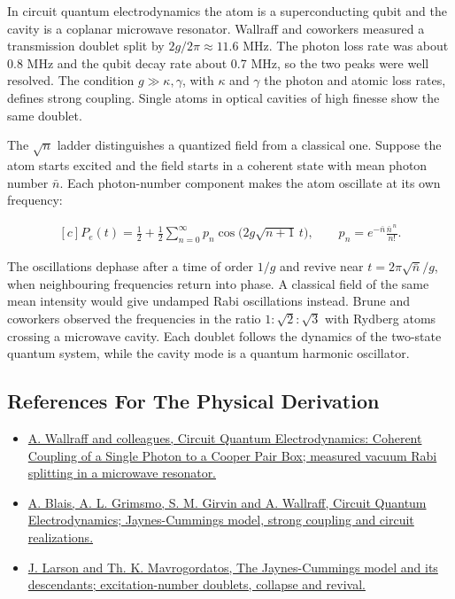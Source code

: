 \documentclass[11pt,oneside]{book}
\newenvironment{centeredalign}{\[\begin{gathered}[c]}{\end{gathered}\]}
\begin{document}
In circuit quantum electrodynamics the atom is a superconducting qubit and the cavity is a coplanar microwave resonator. Wallraff and coworkers measured a transmission doublet split by \(2g/2\pi\approx11.6\) MHz. The photon loss rate was about 0.8 MHz and the qubit decay rate about 0.7 MHz, so the two peaks were well resolved. The condition \(g\gg\kappa,\gamma\), with \(\kappa\) and \(\gamma\) the photon and atomic loss rates, defines strong coupling. Single atoms in optical cavities of high finesse show the same doublet.

The \(\sqrt n\) ladder distinguishes a quantized field from a classical one. Suppose the atom starts excited and the field starts in a coherent state with mean photon number \(\bar n\). Each photon-number component makes the atom oscillate at its own frequency:

\begin{centeredalign}
P_e(t)=\frac12+\frac12\sum_{n=0}^\infty p_n\cos\big(2g\sqrt{n+1}\,t\big),
\qquad p_n=e^{-\bar n}\frac{\bar n^{\,n}}{n!}.
\end{centeredalign}

The oscillations dephase after a time of order \(1/g\) and revive near \(t=2\pi\sqrt{\bar n}/g\), when neighbouring frequencies return into phase. A classical field of the same mean intensity would give undamped Rabi oscillations instead. Brune and coworkers observed the frequencies in the ratio \(1:\sqrt2:\sqrt3\) with Rydberg atoms crossing a microwave cavity. Each doublet follows the dynamics of the two-state quantum system, while the cavity mode is a quantum harmonic oscillator.

\subsection*{References For The Physical Derivation}
\begin{itemize}
\item \href{https://arxiv.org/abs/cond-mat/0407325}{A. Wallraff and colleagues, Circuit Quantum Electrodynamics: Coherent Coupling of a Single Photon to a Cooper Pair Box; measured vacuum Rabi splitting in a microwave resonator.}
\item \href{https://arxiv.org/abs/2005.12667}{A. Blais, A. L. Grimsmo, S. M. Girvin and A. Wallraff, Circuit Quantum Electrodynamics; Jaynes-Cummings model, strong coupling and circuit realizations.}
\item \href{https://arxiv.org/abs/2202.00330}{J. Larson and Th. K. Mavrogordatos, The Jaynes-Cummings model and its descendants; excitation-number doublets, collapse and revival.}
\end{itemize}
\end{document}
